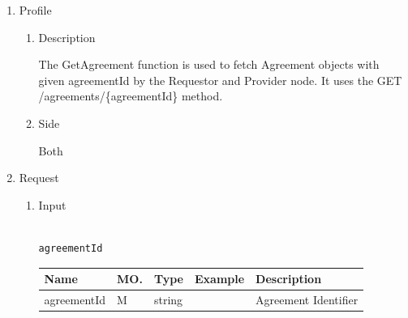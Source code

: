 \newpage


\begin{enumerate}

\item Profile

\begin{enumerate}

\item Description

The GetAgreement function is used to fetch Agreement objects with given agreementId by the Requestor and Provider node. 
It uses the GET /agreements/\{agreementId\} method.

\item Side

Both

\end{enumerate}

\item Request

\begin{enumerate}

\item Input

\begin{tcolorbox}[boxrule=0pt, frame empty]
\begin{verbatim}

agreementId

\end{verbatim}
\end{tcolorbox}


\begin{center}
\begin{tabular}{|p{3cm}|l|p{3cm}|p{3cm}|p{4cm}|} 
\hline
\rowcolor{lightgray}	Name	& MO.	& Type	& Example & 	Description \\
\hline

agreementId	& M & 	string				&			& Agreement Identifier \\
\hline

\end{tabular}
\end{center}


\end{enumerate}
\end{enumerate}
